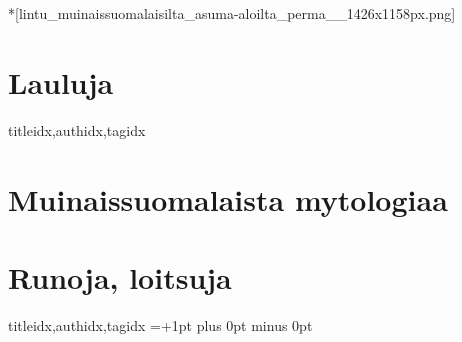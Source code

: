   *[lintu_muinaissuomalaisilta_asuma-aloilta_perma__1426x1158px.png]
    \begin{finnish} %
      \section{Lauluja}
        \begin{songs}{titleidx,authidx,tagidx}
          
          
        \end{songs}
      \clearpage\scleardpage
      \section{Muinaissuomalaista mytologiaa}
        
      \clearpage\scleardpage
      \section{Runoja, loitsuja}
        \begin{songs}{titleidx,authidx,tagidx}
          \chordsoff %
          \baselineadj=+1pt plus 0pt minus 0pt%
          \renewcommand{\lyricfont}{\small} %
          
        \end{songs}
    \end{finnish}

